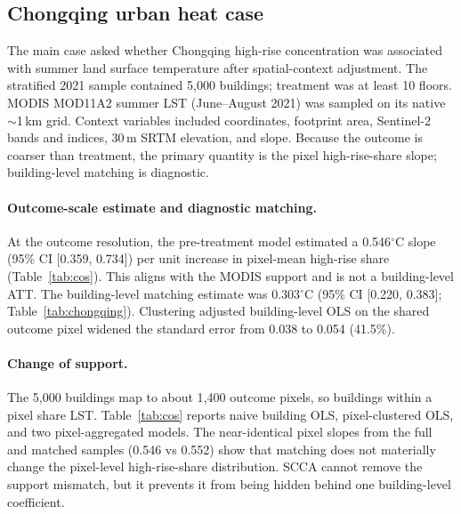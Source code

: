\documentclass{article}
\begin{document}
\subsection{Chongqing urban heat case}

The main case asked whether Chongqing high-rise concentration was associated with summer land surface temperature after spatial-context adjustment. The stratified 2021 sample contained 5{,}000 buildings; treatment was at least 10 floors. MODIS MOD11A2 summer LST (June--August 2021) was sampled on its native $\sim$1\,km grid. Context variables included coordinates, footprint area, Sentinel-2 bands and indices, 30\,m SRTM elevation, and slope. Because the outcome is coarser than treatment, the primary quantity is the pixel high-rise-share slope; building-level matching is diagnostic.

\paragraph{Outcome-scale estimate and diagnostic matching.}
At the outcome resolution, the pre-treatment model estimated a 0.546$^\circ$C slope (95\% CI [0.359, 0.734]) per unit increase in pixel-mean high-rise share (Table~\ref{tab:cos}). This aligns with the MODIS support and is not a building-level ATT. The building-level matching estimate was 0.303$^\circ$C (95\% CI [0.220, 0.383]; Table~\ref{tab:chongqing}). Clustering adjusted building-level OLS on the shared outcome pixel widened the standard error from 0.038 to 0.054 (41.5\%).

\paragraph{Change of support.}
The 5{,}000 buildings map to about 1{,}400 outcome pixels, so buildings within a pixel share LST. Table~\ref{tab:cos} reports naive building OLS, pixel-clustered OLS, and two pixel-aggregated models. The near-identical pixel slopes from the full and matched samples (0.546 vs 0.552) show that matching does not materially change the pixel-level high-rise-share distribution. SCCA cannot remove the support mismatch, but it prevents it from being hidden behind one building-level coefficient.
\end{document}
